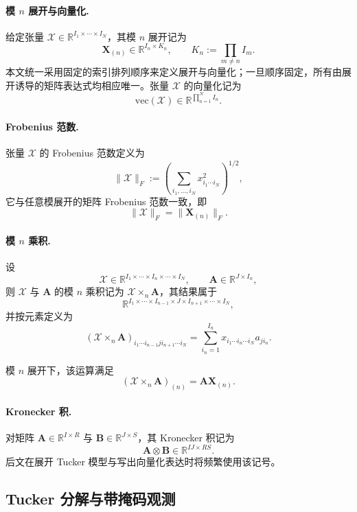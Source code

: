 \paragraph{模 $n$ 展开与向量化.}
给定张量 $\mathcal{X}\in\mathbb{R}^{I_1\times\cdots\times I_N}$，其模 $n$ 展开记为
\[
\mathbf{X}_{(n)} \in \mathbb{R}^{I_n\times K_n},
\qquad
K_n := \prod_{m\neq n} I_m.
\]
本文统一采用固定的索引排列顺序来定义展开与向量化；一旦顺序固定，所有由展开诱导的矩阵表达式均相应唯一。张量 $\mathcal{X}$ 的向量化记为
\[
\mathrm{vec}(\mathcal{X})\in\mathbb{R}^{\prod_{n=1}^N I_n}.
\]

\paragraph{Frobenius 范数.}
张量 $\mathcal{X}$ 的 Frobenius 范数定义为
\[
\|\mathcal{X}\|_F
:=
\left(
\sum_{i_1,\dots,i_N} x_{i_1\cdots i_N}^2
\right)^{1/2},
\]
它与任意模展开的矩阵 Frobenius 范数一致，即
\[
\|\mathcal{X}\|_F = \|\mathbf{X}_{(n)}\|_F.
\]

\paragraph{模 $n$ 乘积.}
设
\[
\mathcal{X}\in\mathbb{R}^{I_1\times\cdots\times I_n\times\cdots\times I_N},
\qquad
\mathbf{A}\in\mathbb{R}^{J\times I_n},
\]
则 $\mathcal{X}$ 与 $\mathbf{A}$ 的模 $n$ 乘积记为 $\mathcal{X}\times_n \mathbf{A}$，其结果属于
\[
\mathbb{R}^{I_1\times\cdots\times I_{n-1}\times J\times I_{n+1}\times\cdots\times I_N},
\]
并按元素定义为
\[
(\mathcal{X}\times_n \mathbf{A})_{i_1\cdots i_{n-1} j i_{n+1}\cdots i_N}
=
\sum_{i_n=1}^{I_n}
x_{i_1\cdots i_n\cdots i_N} a_{j i_n}.
\]

模 $n$ 展开下，该运算满足
\[
(\mathcal{X}\times_n \mathbf{A})_{(n)} = \mathbf{A}\mathbf{X}_{(n)}.
\]

\paragraph{Kronecker 积.}
对矩阵 $\mathbf{A}\in\mathbb{R}^{I\times R}$ 与 $\mathbf{B}\in\mathbb{R}^{J\times S}$，其 Kronecker 积记为
\[
\mathbf{A}\otimes \mathbf{B}\in\mathbb{R}^{IJ\times RS}.
\]
后文在展开 Tucker 模型与写出向量化表达时将频繁使用该记号。

\subsection{Tucker 分解与带掩码观测}

